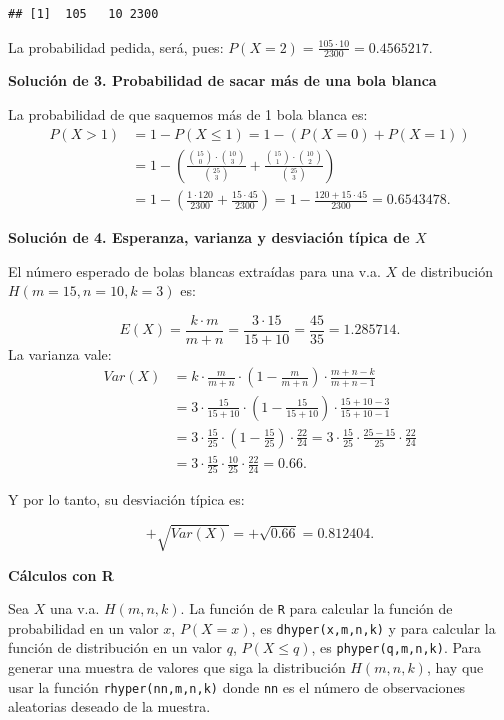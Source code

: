 \documentclass[]{book}
\begin{document}
\begin{verbatim}
## [1]  105   10 2300
\end{verbatim}

La probabilidad pedida, será, pues:
\(P(X=2)=\frac{105\cdot10 }{2300}=0.4565217.\)

\textbf{Solución de 3. Probabilidad de sacar más de una bola blanca}

La probabilidad de que saquemos más de 1 bola blanca es:
\[
\begin{array}{rl}
P(X> 1)&= 1-P(X\leq 1)=1-(P(X=0)+P(X=1))\\
&=
1-\left(\frac{\binom{15}{0}\cdot \binom{10}{3}}{\binom{25}{3}}+
\frac{\binom{15}{1}\cdot \binom{10}{2}}{\binom{25}{3}}\right)\\
&=
1-\left(
\frac{1\cdot120 }{2300}+\frac{15\cdot45 }{2300}
\right)=1-\frac{120+15\cdot 45}{2300}=0.6543478.
\end{array}
\]

\textbf{Solución de 4. Esperanza, varianza y desviación típica de \(X\)}

El número esperado de bolas blancas extraídas para una v.a. \(X\) de distribución \(H(m=15,n=10,k=3)\) es:

\[E(X)=\frac{k\cdot m}{m+n}=\frac{3\cdot 15}{15+10}=\frac{45}{35}=1.285714.\]
La varianza vale:
\[
\begin{array}{rl}
Var(X)&=k\cdot\frac{m}{m+n}\cdot\left(1-\frac{m}{m+n}\right) \cdot\frac{m+n-k}{m+n-1}\\
&=3\cdot\frac{15}{15+10}\cdot\left(1-\frac{15}{15+10}\right) \cdot\frac{15+10-3}{15+10-1}\\
&=
3\cdot\frac{15}{25}\cdot\left(1-\frac{15}{25}\right) \cdot\frac{22}{24}= 
3\cdot\frac{15}{25}\cdot\frac{25-15}{25} \cdot\frac{22}{24}\\
&=
3\cdot\frac{15}{25}\cdot\frac{10}{25}\cdot\frac{22}{24}=0.66.
\end{array}
\]

Y por lo tanto, su desviación típica es:

\[
+\sqrt{Var(X)}=+\sqrt{0.66}=0.812404.
\]

\textbf{Cálculos con R}

Sea \(X\) una v.a. \(H(m,n,k)\). La función de \texttt{R} para calcular la función de probabilidad en un valor \(x\), \(P(X=x)\), es \texttt{dhyper(x,m,n,k)} y para calcular la función de distribución en un valor \(q\), \(P(X\leq q)\), es \texttt{phyper(q,m,n,k)}. Para generar una muestra de valores que siga la distribución \(H(m,n,k)\), hay que usar la función \texttt{rhyper(nn,m,n,k)} donde \texttt{nn} es el número de observaciones aleatorias deseado de la muestra.
\end{document}
